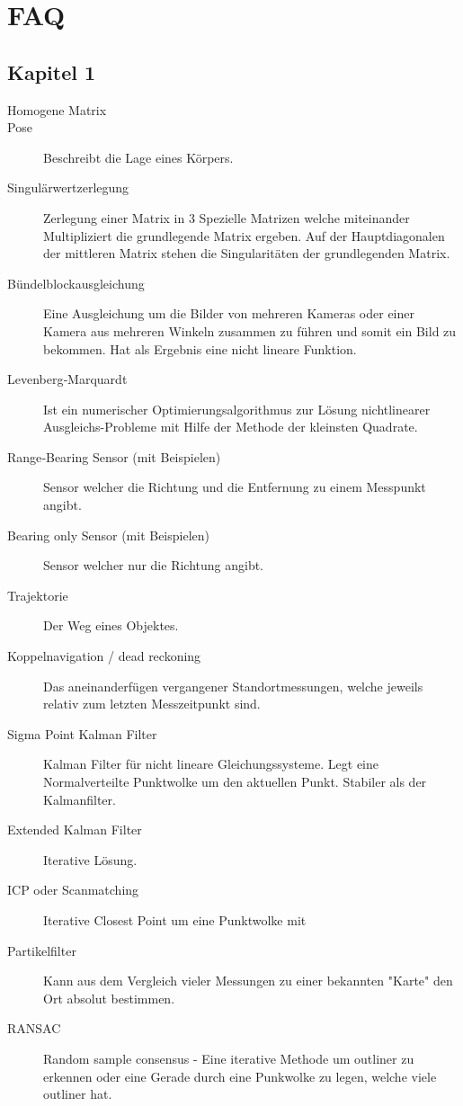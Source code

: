 \chapter{FAQ}
\label{cha:faq}

\section{Kapitel 1}
\label{sec:faq:kap1}
\begin{description}
	\item[Homogene Matrix]
 	\item[Pose] Beschreibt die Lage eines Körpers.
	\item[Singulärwertzerlegung] Zerlegung einer Matrix in 3 Spezielle Matrizen welche miteinander Multipliziert die grundlegende Matrix ergeben. Auf der Hauptdiagonalen der mittleren Matrix stehen die Singularitäten der grundlegenden Matrix. 
	\item[Bündelblockausgleichung] Eine Ausgleichung um die Bilder von mehreren Kameras oder einer Kamera aus mehreren Winkeln zusammen zu führen und somit ein Bild zu bekommen. Hat als Ergebnis eine nicht lineare Funktion.
	\item[Levenberg‐Marquardt] Ist ein numerischer Optimierungsalgorithmus zur Lösung nichtlinearer Ausgleichs-Probleme mit Hilfe der Methode der kleinsten Quadrate. 
	\item[Range‐Bearing Sensor (mit Beispielen)] Sensor welcher die Richtung und die Entfernung zu einem Messpunkt angibt.
	\item[Bearing only Sensor (mit Beispielen)] Sensor welcher nur die Richtung angibt.
	\item[Trajektorie] Der Weg eines Objektes.
	\item[Koppelnavigation / dead reckoning] Das aneinanderfügen vergangener Standortmessungen, welche jeweils relativ zum letzten Messzeitpunkt sind.
	\item[Sigma Point Kalman Filter] Kalman Filter für nicht lineare Gleichungssysteme. Legt eine Normalverteilte Punktwolke um den aktuellen Punkt. Stabiler als der Kalmanfilter.
	\item[Extended Kalman Filter] Iterative Lösung.
	\item[ICP oder Scanmatching] Iterative Closest Point um eine Punktwolke mit 
	\item[Partikelfilter] Kann aus dem Vergleich vieler Messungen zu einer bekannten "Karte" den Ort absolut bestimmen.
	\item[RANSAC]Random sample consensus - Eine iterative Methode um outliner zu erkennen oder eine Gerade durch eine Punkwolke zu legen, welche viele outliner hat.

\end{description}
